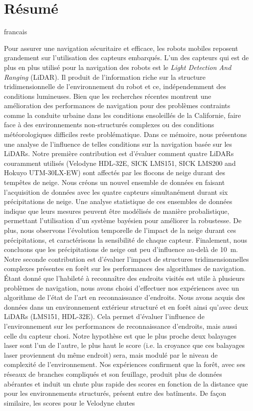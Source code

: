 \chapter*{Résumé}

\begin{otherlanguage*}{francais}

    Pour assurer une navigation sécuritaire et efficace, les robots mobiles reposent grandement sur l'utilisation des capteurs embarqués. L'un des capteurs qui est de plus en plus utilisé pour la navigation des robots est le \emph{Light Detection And Ranging} (LiDAR). Il produit de l'information riche sur la structure tridimensionnelle de l'environnement du robot et ce, indépendemment des conditions lumineuses. Bien que les recherches récentes montrent une amélioration des performances de navigation pour des problèmes contraints comme la conduite urbaine dans les conditions ensoleillés de la Californie, faire face à des environnements non-structurés complexes ou des conditions météorologiques difficiles reste problématique. Dans ce mémoire, nous présentons une analyse de l'influence de telles conditions sur la navigation basée sur les LiDARs. Notre première contribution est d'évaluer comment quatre LiDARs couramment utilisés (Velodyne HDL-32E, SICK LMS151, SICK LMS200 and Hokuyo UTM-30LX-EW) sont affectés par les flocons de neige durant des tempêtes de neige. Nous créons un nouvel ensemble de données en faisant l'acquisition de données avec les quatre capteurs simultanément durant six précipitations de neige. Une analyse statistique de ces ensembles de données indique que leurs mesures peuvent être modélisés de manière probalistique, permettant l'utilisation d'un système bayésien pour améliorer la robustesse. De plus, nous observons l'évolution temporelle de l'impact de la neige durant ces précipitations, et caractérisons la sensibilité de chaque capteur. Finalement, nous concluons que les précipitations de neige ont peu d'influence au-delà de \SI{10}{\meter}. Notre seconde contribution est d'évaluer l'impact de structures tridimensionnelles complexes présentes en forêt sur les performances des algorithmes de navigation. Étant donné que l'habileté à reconnaître des endroits visités est utile à plusieurs problèmes de navigation, nous avons choisi d'effectuer nos expériences avec un algorithme de l'état de l'art en reconnaissance d'endroits. Nous avons acquis des données dans un environnement extérieur structuré et en forêt ainsi qu'avec deux LiDARs (LMS151, HDL-32E). Cela permet d'évaluer l'influence de l'environnement sur les performances de reconnaissance d'endroits, mais aussi celle du capteur chosi. Notre hypothèse est que le plus proche deux balayages laser sont l'un de l'autre, le plus haut le score (i.e. la croyance que ces balayages laser proviennent du même endroit) sera, mais modulé par le niveau de complexité de l'environnement. Nos expériences confirment que la forêt, avec ses réseaux de branches compliqués et son feuillage, produit plus de données abérantes et induit un chute plus rapide des scores en fonction de la distance que pour les environnements structurés, présent entre des batîments. De façon similaire, les scores pour le Velodyne chutes 
\end{otherlanguage*}
